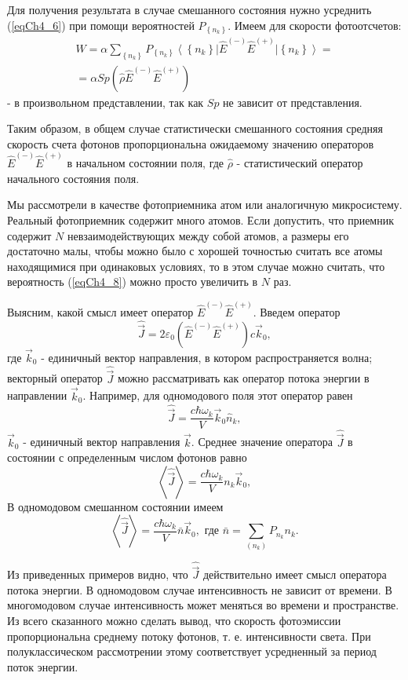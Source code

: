 Для получения результата в случае смешанного состояния нужно усреднить
(\ref{eqCh4_6}) при помощи вероятностей  $P_{\left\{n_k\right\}}$.
Имеем для скорости фотоотсчетов: 
\begin{eqnarray}
W = \alpha \sum_{\left\{n_k\right\}}P_{\left\{n_k\right\}}
\left<\left\{n_k\right\}\right|\hat{E}^{(-)}\hat{E}^{(+)}\left|\left\{n_k\right\}\right> =
\nonumber \\
=
\alpha Sp\left(\hat{\rho}\hat{E}^{(-)}\hat{E}^{(+)}\right)
\label{eqCh4_8}
\end{eqnarray}
- в произвольном представлении, так как $Sp$ не зависит от
представления.

Таким образом, в общем случае статистически смешанного состояния
средняя скорость счета фотонов пропорциональна ожидаемому значению
операторов $\hat{E}^{(-)}\hat{E}^{(+)}$ в начальном состоянии поля,
где $\hat{\rho}$ - статистический оператор начального состояния поля.  

Мы рассмотрели в качестве фотоприемника атом или аналогичную
микросистему. Реальный фотоприемник содержит много атомов. Если
допустить, что приемник содержит $N$ невзаимодействующих между собой
атомов, а размеры его достаточно малы, чтобы можно было с хорошей
точностью считать все атомы находящимися при одинаковых условиях, то в
этом случае можно считать, что вероятность (\ref{eqCh4_8}) можно
просто увеличить в $N$ раз. 

Выясним, какой смысл имеет оператор $\hat{E}^{(-)}\hat{E}^{(+)}$.
Введем оператор 
\begin{equation}
\hat{\vec{J}} = 2 \varepsilon_0
\left(\hat{E}^{(-)}\hat{E}^{(+)}\right) c \vec{k}_0,
\label{eqCh4_9}
\end{equation}
где $\vec{k}_0$ - единичный вектор направления, в котором
распространяется волна; векторный оператор
$\hat{\vec{J}}$ можно рассматривать как 
оператор потока энергии в направлении  $\vec{k}_0$.  Например, для
одномодового поля этот оператор равен 
\begin{equation}
\hat{\vec{J}} = \frac{c \hbar \omega_k}{V} \vec{k}_0 \hat{n}_k,
\label{eqCh4_10}
\end{equation}
$\vec{k}_0$ - единичный вектор направления $\vec{k}$.  Среднее
значение оператора $\hat{\vec{J}}$ в состоянии с определенным числом
фотонов равно  
\[
\left<\hat{\vec{J}}\right> = \frac{c \hbar \omega_k}{V} n_k \vec{k}_0,
\]
В одномодовом смешанном состоянии имеем
\[
\left<\hat{\vec{J}}\right> = \frac{c \hbar \omega_k}{V} \bar{n} \vec{k}_0,   \mbox{ где }   \bar{n} = \sum_{(n_k)}P_{n_k} n_k.
\]

Из приведенных примеров видно, что $\hat{\vec{J}}$ действительно имеет смысл
оператора потока энергии. В одномодовом случае интенсивность не
зависит от времени. В многомодовом случае интенсивность может меняться
во времени и пространстве. Из всего сказанного можно сделать вывод,
что скорость фотоэмиссии пропорциональна среднему потоку фотонов,
т. е. интенсивности света. При полуклассическом рассмотрении этому
соответствует усредненный за период поток энергии. 
